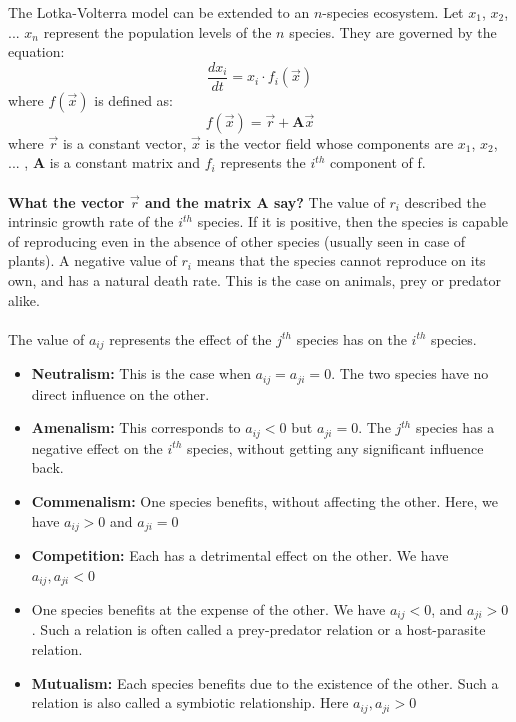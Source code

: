 \documentclass{article}
\begin{document}
The Lotka-Volterra model can be extended to an $n$-species ecosystem. Let $x_1$, $x_2$, ... $x_n$ represent the population levels of the $n$ species. They are governed by the equation:
$$\frac{dx_i}{dt} = x_i \cdot f_i(\overrightarrow{x})$$
where $f(\overrightarrow{x})$ is defined as:
$$f(\overrightarrow{x}) = \overrightarrow{r} + \boldsymbol{A}\overrightarrow{x}$$
where $\overrightarrow{r}$ is a constant vector, $\overrightarrow{x}$ is the vector field whose components are $x_1$, $x_2$, ... , $\boldsymbol{A}$ is a constant matrix and $f_i$ represents the $i^{th}$ component of f.
\\
\\
\textbf{What the vector $\overrightarrow{r}$ and the matrix A say?}
The value of $r_i$ described the intrinsic growth rate of the $i^{th}$ species. If it is positive, then the species is capable of reproducing even in the absence of other species (usually seen in case of plants). A negative value of $r_i$ means that the species cannot reproduce on its own, and has a natural death rate. This is the case on animals, prey or predator alike.
\\
\\
The value of $a_{ij}$ represents the effect of the $j^{th}$ species has on the $i^{th}$ species.

\begin{itemize}
    \item \textbf{Neutralism: } This is the case when $a_{ij} = a_{ji} = 0$. The two species have no direct influence on the other.
    \item \textbf{Amenalism: } This corresponds to $a_{ij} < 0$ but $a_{ji} = 0$. The $j^{th}$ species has a negative effect on the $i^{th}$ species, without getting any significant influence back.
    \item \textbf{Commenalism: } One species benefits, without affecting the other. Here, we have $a_{ij} > 0$ and $a_{ji} = 0$
    \item \textbf{Competition: } Each has a detrimental effect on the other. We have $a_{ij}, a_{ji} < 0$
    \item {} One species benefits at the expense of the other. We have $a_{ij} < 0$, and $a_{ji} > 0$. Such a relation is often called a prey-predator relation or a host-parasite relation.
    \item \textbf{Mutualism: } Each species benefits due to the existence of the other. Such a relation is also called a symbiotic relationship. Here $a_{ij}, a_{ji} > 0$
\end{itemize}
\end{document}
